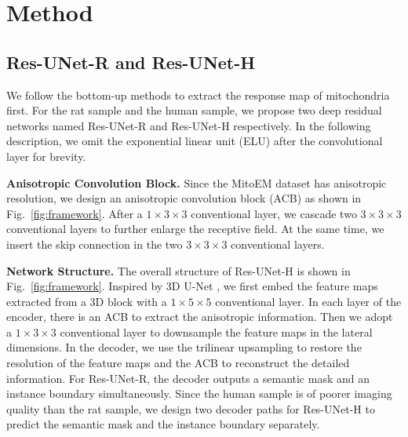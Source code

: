 \documentclass{article}
\begin{document}
\section{Method}
\label{sec:method}
\subsection{Res-UNet-R and Res-UNet-H}
We follow the bottom-up methods to extract the response map of mitochondria first. For the rat sample and the human sample, we propose two deep residual networks named Res-UNet-R and Res-UNet-H respectively. In the following description, we omit the exponential linear unit (ELU) after the convolutional layer for brevity.

\textbf{Anisotropic Convolution Block.} 
Since the MitoEM dataset has anisotropic resolution, we design an anisotropic convolution block (ACB) as shown in Fig.~\ref{fig:framework}. After a $1\times 3 \times 3$ conventional layer, we cascade two  $3\times 3 \times 3$ conventional layers to further enlarge the receptive field. At the same time, we insert the skip connection in the two  $3\times 3 \times 3$ conventional layers. 

\textbf{Network Structure.}
The overall structure of Res-UNet-H is shown in Fig.~\ref{fig:framework}. Inspired by 3D U-Net \cite{cciccek20163d}, we first embed the feature maps extracted from a 3D block with a $1\times 5 \times 5$ conventional layer. In each layer of the encoder, there is an ACB to extract the anisotropic information. Then we adopt a $1\times 3 \times 3$ conventional layer to downsample the feature maps in the lateral dimensions. In the decoder, we use the trilinear upsampling to restore the resolution of the feature maps and the ACB to reconstruct the detailed information. For Res-UNet-R, the decoder outputs a semantic mask and an instance boundary simultaneously. Since the human sample is of poorer imaging quality than the rat sample, we design two decoder paths for Res-UNet-H to predict the semantic mask and the instance boundary separately.
\end{document}
